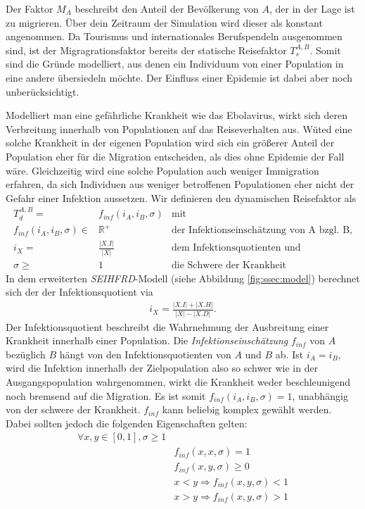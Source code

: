 


Der Faktor $M_A$ beschreibt den Anteil der Bevölkerung von $A$, der in der Lage ist zu migrieren. Über dein Zeitraum der Simulation wird dieser als konstant angenommen. Da Tourismus und internationales Berufspendeln ausgenommen sind, ist der Migragrationsfaktor bereits der statische Reisefaktor $T^{A,B}_s$. Somit sind die Gründe modelliert, aus denen ein Individuum von einer Population in eine andere übersiedeln möchte. Der Einfluss einer Epidemie ist dabei aber noch unberücksichtigt. 

Modelliert man eine gefährliche Krankheit wie das Ebolavirus, wirkt sich deren Verbreitung innerhalb von Populationen auf das Reiseverhalten aus. Wüted eine solche Krankheit in der eigenen Population wird sich ein größerer Anteil der Population eher für die Migration entscheiden, als dies ohne Epidemie der Fall wäre. Gleichzeitig wird eine solche Population auch weniger Immigration erfahren, da sich Individuen aus weniger betroffenen Populationen eher nicht der Gefahr einer Infektion aussetzen. Wir definieren den dynamischen Reisefaktor als
\begin{align}
	T^{A,B}_d =& f_{inf}(i_A,i_B, \sigma)&\text{mit}\\
	f_{inf}(i_A,i_B,\sigma) \in& \mathbb{R}^+&\text{der Infektionseinschätzung von A bzgl. B,}\\
	i_X =& \frac{|X.I|}{|X|}&\text{dem Infektionsquotienten und}\\
	\sigma \geq&1 & \text{die Schwere der Krankheit}
\end{align}
In dem erweiterten \emph{SEIHFRD}-Modell (siehe Abbildung \ref{fig:ssec:model}) berechnet sich der der Infektionsquotient via 
\begin{align}
	i_X = \frac{|X.I|+|X.H|}{|X| - |X.D|}.
\end{align}
Der Infektionsquotient beschreibt die Wahrnehmung der Ausbreitung einer Krankheit innerhalb einer Population. Die \emph{Infektionseinschätzung} $f_{inf}$ von $A$ bezüglich $B$ hängt von den Infektionsquotienten von $A$ und $B$ ab. Ist $i_A = i_B$, wird die Infektion innerhalb der Zielpopulation also so schwer wie in der Ausgangspopulation wahrgenommen, wirkt die Krankheit weder beschleunigend noch bremsend auf die Migration. Es ist somit $f_{inf}(i_A,i_B,\sigma)=1$, unabhängig von der schwere der Krankheit. $f_{inf}$ kann beliebig komplex gewählt werden. Dabei sollten jedoch die folgenden Eigenschaften gelten:
\begin{align}
	\forall x, y \in [0,1], \sigma \geq 1 & \nonumber\\
		& f_{inf}(x,x,\sigma) = 1\\
		& f_{inf}(x,y,\sigma) \geq 0\\
		& x < y \Rightarrow f_{inf}(x,y,\sigma) < 1 \label{eq:ssec:multiPop:infRisklow}\\
		& x > y \Rightarrow f_{inf}(x,y,\sigma) > 1 \label{eq:ssec:multiPop:infRiskhigh}
\end{align}
